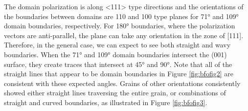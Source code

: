 The domain polarization is along <111> type directions and the orientations of the
boundaries between domains are {110} and {100} type planes for 71\si{\degree} and
109\si{\degree} domain boundaries, respectively.\cite{Catalan:2009ca} For 180\si{\degree}
boundaries, where the polarization vectors are anti-parallel, the plane can take any
orientation in the zone of [111]. Therefore, in the general case, we can expect to see
both straight and wavy boundaries. When the 71\si{\degree} and 109\si{\degree} domain
boundaries intersect the (001) surface, they create traces that intersect at
45\si{\degree} and 90\si{\degree}. Note that all of the straight lines that appear to be
domain boundaries in Figure \ref{fig:bfofig2} are consistent with these expected angles.
Grains of other orientations consistently showed either straight lines traversing the
entire grain, or combinations of straight and curved boundaries, as illustrated in Figure
\ref{fig:bfofig3}.

